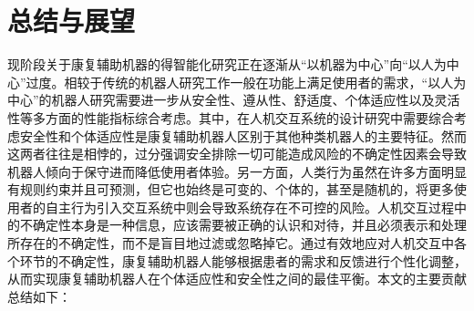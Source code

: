 \chapter{总结与展望}
现阶段关于康复辅助机器的得智能化研究正在逐渐从``以机器为中心''向``以人为中心''过度。相较于传统的机器人研究工作一般在功能上满足使用者的需求，``以人为中心''的机器人研究需要进一步从安全性、遵从性、舒适度、个体适应性以及灵活性等多方面的性能指标综合考虑。其中，在人机交互系统的设计研究中需要综合考虑安全性和个体适应性是康复辅助机器人区别于其他种类机器人的主要特征。然而这两者往往是相悖的，过分强调安全排除一切可能造成风险的不确定性因素会导致机器人倾向于保守进而降低使用者体验。另一方面，人类行为虽然在许多方面明显有规则约束并且可预测，但它也始终是可变的、个体的，甚至是随机的，将更多使用者的自主行为引入交互系统中则会导致系统存在不可控的风险。人机交互过程中的不确定性本身是一种信息，应该需要被正确的认识和对待，并且必须表示和处理所存在的不确定性，而不是盲目地过滤或忽略掉它。通过有效地应对人机交互中各个环节的不确定性，康复辅助机器人能够根据患者的需求和反馈进行个性化调整，从而实现康复辅助机器人在个体适应性和安全性之间的最佳平衡。本文的主要贡献总结如下：
